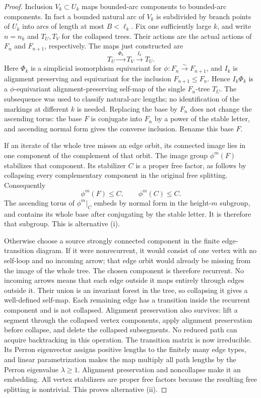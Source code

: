 \begin{proof}
Inclusion $V_k\subset U_k$ maps bounded-arc components to bounded-arc
components. In fact a bounded natural arc of $V_k$ is subdivided by
branch points of $U_k$ into arcs of length at most $B<\ell_k$.
Fix one sufficiently large $k$, and write $n=n_k$ and
$T_U,T_V$ for the collapsed trees. Their actions are the actual actions
of $F_n$ and $F_{n+1}$, respectively. The maps just constructed are
\[
 T_U\xrightarrow{\ \Phi_k\ }T_V
     \xrightarrow{\ I_k\ }T_U.
\]
Here $\Phi_k$ is a simplicial isomorphism equivariant for
$\phi:F_n\xrightarrow{\sim}F_{n+1}$, and $I_k$ is alignment preserving
and equivariant for the inclusion $F_{n+1}\leq F_n$. Hence
$I_k\Phi_k$ is a $\phi$-equivariant alignment-preserving self-map of the
single $F_n$-tree $T_U$. The subsequence was used to classify natural-arc
lengths; no identification of the markings at different $k$ is needed.
Replacing the base by $F_n$
does not change the ascending torus: the base $F$ is conjugate into
$F_n$ by a power of the stable letter, and ascending normal form
gives the converse inclusion. Rename this base $F$.

If an iterate of the whole tree misses an edge orbit, its connected
image lies in one component of the complement of that orbit. The image
group $\phi^m(F)$ stabilizes that component. Its stabilizer $C$ is a
proper free factor, as follows by collapsing every complementary
component in the original free splitting. Consequently
\[
 \phi^m(F)\le C,\qquad \phi^m(C)\le C.
\]
The ascending torus of $\phi^m|_C$ embeds by normal form in the height-$m$
subgroup, and contains its whole base after conjugating by the stable
letter. It is therefore that subgroup. This is alternative (i).

Otherwise choose a source strongly connected component in the finite
edge-transition diagram. If it were nonrecurrent, it would consist of
one vertex with no self-loop and no incoming arrow; that edge orbit
would already be missing from the image of the whole tree. The chosen
component is therefore recurrent. No incoming arrows means that each
edge outside it maps entirely through edges outside it. Their union is
an invariant forest in the tree, so collapsing it gives a well-defined
self-map. Each remaining edge has a transition inside the recurrent
component and is not collapsed. Alignment preservation also survives:
lift a segment through
the collapsed vertex components, apply alignment preservation before
collapse, and delete the collapsed subsegments. No reduced path can
acquire backtracking in this operation. The transition matrix is now
irreducible. Its Perron eigenvector assigns positive lengths to the
finitely many edge types, and linear parametrization makes the map
multiply all path lengths by the Perron eigenvalue $\lambda\ge1$.
Alignment preservation and noncollapse make it an embedding.
All vertex stabilizers are proper free factors because the resulting
free splitting is nontrivial. This proves alternative (ii).
\end{proof}

